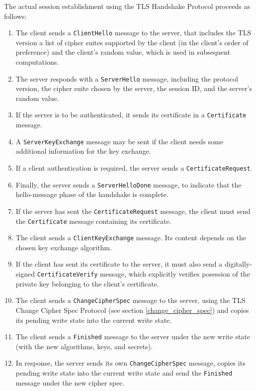     \noindent The actual session establishment using the TLS Handshake Protocol
    proceeds as follows:
    \begin{enumerate}
        \item The client sends a \texttt{ClientHello} message to the server, that
              includes the TLS version a list of cipher suites supported by the
              client (in the client's order of preference) and the client's
              random value, which is used in subsequent computations.
        \item The server responds with a \texttt{ServerHello} message, including
              the protocol version, the cipher suite chosen by the server, the session ID,
              and the server's random value.
        \item If the server is to be authenticated, it sends its certificate in
              a \texttt{Certificate} message.
        \item A \texttt{ServerKeyExchange} message may be sent if the client
              needs some additional information for the key exchange.
        \item If a client authentication is required, the server sends a
              \texttt{CertificateRequest}.
        \item Finally, the server sends a \texttt{ServerHelloDone} message, to
              indicate that the hello-message phase of the handshake is complete.
        \item If the server has sent the \texttt{CertificateRequest} message, the
              client must send the \texttt{Certificate} message containing its
              certificate.
        \item The client sends a \texttt{ClientKeyExchange} message. Its content
              depends on the chosen key exchange algorithm.
        \item If the client has sent its certificate to the server, it must also
              send a digitally-signed \texttt{CertificateVerify} message, which
              explicitly verifies posession of the private key belonging to the
              client's certificate.
        \item The client sends a \texttt{ChangeCipherSpec} message to the server,
              using the TLS Change Cipher Spec Protocol (see
              section \ref{change_cipher_spec}) and copies its pending write state
              into the current write state.
        \item The client sends a \texttt{Finished} message to the server under
              the new write state (with the new algorithms, keys, and secrets).
        \item In response, the server sends its own \texttt{ChangeCipherSpec}
              message, copies its pending write state into the current write
              state and send the \texttt{Finished} message under the new cipher
              spec.
    \end{enumerate}

